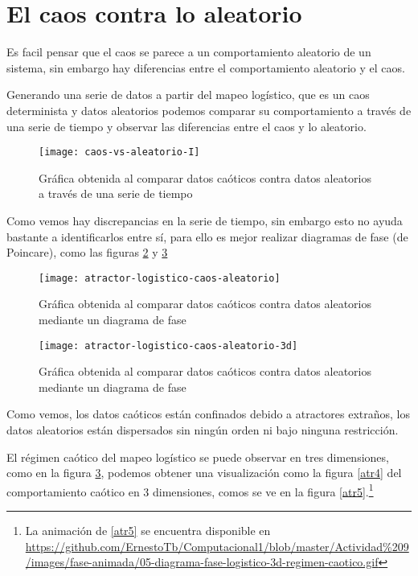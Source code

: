 \pagebreak
\newpage

\section{El caos contra lo aleatorio}
\noindent Es facil pensar que el caos se parece a un comportamiento aleatorio de un sistema, sin embargo hay diferencias entre el comportamiento aleatorio y el caos.

Generando una serie de datos a partir del mapeo logístico, que es un caos determinista y datos aleatorios podemos comparar su comportamiento a través de una serie de tiempo y observar las diferencias entre el caos y lo aleatorio.

\begin{figure}[ht!]
\centering
\texttt{[image: caos-vs-aleatorio-I]}
\caption{Gráfica obtenida al comparar datos caóticos contra datos aleatorios a través de una serie de tiempo}
\label{cva1}
\end{figure}
\pagebreak 
\newpage
Como vemos hay discrepancias en la serie de tiempo, sin embargo esto no ayuda bastante a identificarlos entre sí, para ello es mejor realizar diagramas de fase (de Poincare), como las figuras \ref{cva2} y \ref{cva3}

\begin{figure}[ht!]
\centering
\texttt{[image: atractor-logistico-caos-aleatorio]}
\caption{Gráfica obtenida al comparar datos caóticos contra datos aleatorios mediante un diagrama de fase}
\label{cva2}
\end{figure}

\begin{figure}[ht!]
\centering
\texttt{[image: atractor-logistico-caos-aleatorio-3d]}
\caption{Gráfica obtenida al comparar datos caóticos contra datos aleatorios mediante un diagrama de fase}
\label{cva3}
\end{figure}

Como vemos, los datos caóticos están confinados debido a atractores extraños, los datos aleatorios están dispersados sin ningún orden ni bajo ninguna restricción.

El régimen caótico del mapeo logístico se puede observar en tres dimensiones, como en la figura \ref{cva3}, podemos obtener una visualización como la figura \ref{atr4} del comportamiento caótico en 3 dimensiones, comos se ve en la figura \ref{atr5}.\footnote{ La animación de \ref{atr5} se encuentra disponible en \url{https://github.com/ErnestoTb/Computacional1/blob/master/Actividad\%209/images/fase-animada/05-diagrama-fase-logistico-3d-regimen-caotico.gif}}

